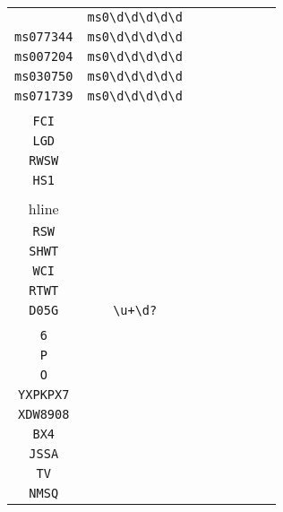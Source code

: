 \begin{longtable}{cccccccc}
\begin{tabular}{ll}
    \verb|ms098383| & \verb|ms0\d\d\d\d\d|\\
\verb|ms077344| & \verb|ms0\d\d\d\d\d|\\
\verb|ms007204| & \verb|ms0\d\d\d\d\d|\\
\verb|ms030750| & \verb|ms0\d\d\d\d\d|\\
\verb|ms071739| & \verb|ms0\d\d\d\d\d|
\end{tabular}
\\\midrule 
\begin{tabular}{l}
    \verb|HS2|\\
\verb|FCI|\\
\verb|LGD|\\
\verb|RWSW|\\
\verb|HS1|\\
\\hline\\
\verb|RSW|\\
\verb|SHWT|\\
\verb|WCI|\\
\verb|RTWT|\\
\verb|D05G|
\end{tabular}

&
\verb|\u+\d?|
&

\begin{tabular}{l}
    \verb|(\u)*(\d)*|\\
\verb||\\
\verb|6|\\
\verb|P|\\
\verb|O|\\
\verb|YXPKPX7|
\end{tabular}

&

\begin{tabular}{l}
    \verb.\u\u((\u)*(\d)*)|(S\u).\\
\verb|XDW8908|\\
\verb|BX4|\\
\verb|JSSA|\\
\verb|TV|\\
\verb|NMSQ|
\end{tabular}

&


\end{longtable}
